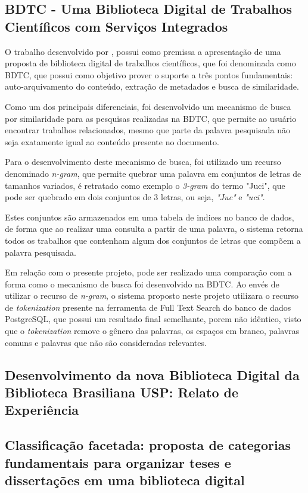 \subsection{BDTC - Uma Biblioteca Digital de Trabalhos Científicos com Serviços Integrados}

O trabalho desenvolvido por \cite{CERVI:bdtc}, possui como premissa a apresentação
de uma proposta de biblioteca digital de trabalhos científicos, que foi denominada como
BDTC, que possui como objetivo prover o suporte a três pontos fundamentais:
auto-arquivamento do conteúdo, extração de metadados e busca de similaridade.

Como um dos principais diferenciais, foi desenvolvido um mecanismo de
busca por similaridade para as pesquisas realizadas na BDTC,
que permite ao usuário encontrar trabalhos relacionados, mesmo que
parte da palavra pesquisada não seja exatamente igual ao conteúdo presente
no documento.

Para o desenvolvimento deste mecanismo de busca, foi utilizado
um recurso denominado \emph{n-gram}, que permite quebrar uma palavra em
conjuntos de letras de tamanhos variados, é retratado como exemplo o
\emph{3-gram} do termo "Juci", que pode ser quebrado em dois conjuntos de 3
letras, ou seja, \emph{"Juc"} e \emph{"uci"}.

Estes conjuntos são armazenados em uma tabela de indices no banco de
dados, de forma que ao realizar uma consulta a partir de uma palavra,
o sistema retorna todos os trabalhos que contenham algum dos conjuntos
de letras que compõem a palavra pesquisada.

Em relação com o presente projeto, pode ser realizado uma comparação com
a forma como o mecanismo de busca foi desenvolvido na BDTC. Ao envés de
utilizar o recurso de \emph{n-gram}, o sistema proposto neste projeto utilizara
o recurso de \emph{tokenization} presente na ferramenta de Full Text Search do
banco de dados PostgreSQL, que possui um resultado final semelhante, porem não
idêntico, visto que o \emph{tokenization} remove o gênero das palavras,
os espaços em branco, palavras comuns e palavras que não são consideradas relevantes.

\subsection{Desenvolvimento da nova Biblioteca Digital da Biblioteca Brasiliana USP: Relato de Experiência}

\subsection{Classificação facetada: proposta de categorias fundamentais para organizar teses e dissertações em uma biblioteca digital}

